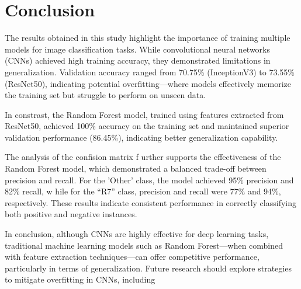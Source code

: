 \documentclass[12pt]{article}
\begin{document}
\section*{Conclusion }
The results obtained in this study highlight the importance of training multiple models for image classification tasks. While convolutional neural networks (CNNs) achieved high training accuracy, they demonstrated limitations in generalization. Validation accuracy ranged from 70.75\% (InceptionV3) to 73.55\% (ResNet50), indicating potential overfitting—where models effectively memorize the training set but struggle to perform on unseen data. 

In constrast, the Random Forest model, trained using features extracted from ResNet50, achieved 100\% accuracy on the training set and maintained superior validation performance (86.45\%), indicating better generalization capability. 

The analysis of the confision matrix f urther supports the effectiveness of the Random Forest model, which demonstrated a balanced trade-off between precision and recall. For the 'Other' class, the model achieved 95\% precision and 82\% recall, w hile for the “R7” class, precision and recall were 77\% and 94\%, respectively. These results indicate consistent performance in correctly classifying both positive and negative instances. 

In conclusion, although CNNs are highly effective for deep learning tasks, traditional machine learning models such as Random Forest—when combined with feature extraction techniques—can offer competitive performance, particularly in terms of generalization. Future research should explore strategies to mitigate overfitting in CNNs, including


\end{document}
